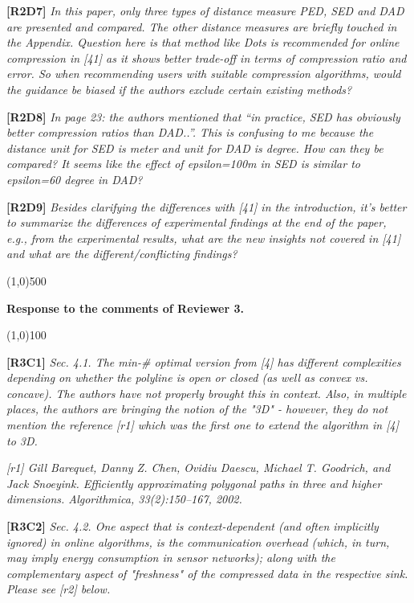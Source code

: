 \documentclass{letter}
\begin{document}
\textbf{[R2D7]} \emph{In this paper, only three types of distance measure PED, SED and DAD are presented and compared. The other distance measures are briefly touched in the Appendix. Question here is that method like Dots is recommended for online compression in [41] as it shows better trade-off in terms of compression ratio and error. So when recommending users with suitable compression algorithms, would the guidance be biased if the authors exclude certain existing methods?}

\textbf{[R2D8]} \emph{In page 23: the authors mentioned that “in practice, SED has obviously better compression ratios than DAD..”. This is confusing to me because the distance unit for SED is meter and unit for DAD is degree. How can they be compared? It seems like the effect of epsilon=100m in SED is similar to epsilon=60 degree in DAD?}

\textbf{[R2D9]} \emph{Besides clarifying the differences with [41] in the introduction, it’s better to summarize the differences of experimental findings at the end of the paper, e.g., from the experimental results, what are the new insights not covered in [41] and what are the different/conflicting findings?}

\line(1,0){500}

\textbf{Response to the comments of Reviewer 3.}

\line(1,0){100}

\textbf{[R3C1]} \emph{
Sec. 4.1. The min-\# optimal version from [4] has different complexities depending on whether the polyline is open or closed (as well as convex vs. concave). The authors have not properly brought this in context.
Also, in multiple places, the authors are bringing the notion of the "3D" - however, they do not mention the reference [r1] which was the first one to extend the algorithm in [4] to 3D. }

\emph{[r1] Gill Barequet, Danny Z. Chen, Ovidiu Daescu, Michael T. Goodrich, and Jack Snoeyink. Efficiently approximating polygonal paths in three and higher dimensions. Algorithmica, 33(2):150–167, 2002.}

\textbf{[R3C2]} \emph{
Sec. 4.2. One aspect that is context-dependent (and often implicitly ignored) in online algorithms, is the communication overhead (which, in turn, may imply energy consumption in sensor networks); along with the complementary aspect of "freshness" of the compressed data in the respective sink. Please see [r2] below.}
\end{document}
